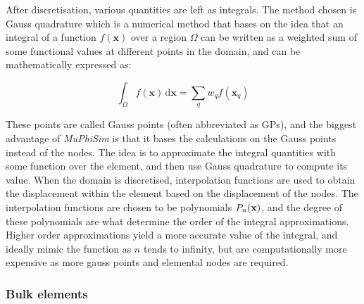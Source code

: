 \documentclass[oneside,11pt,times]{book}
\begin{document}
After discretisation, various quantities are left as integrals. The method chosen is Gauss quadrature which is a numerical method that bases on the idea that an integral of a function $f(\bm{x})$ over a region $\Omega$ can be written as a weighted sum of some functional values at different points in the domain, and can be mathematically expressed as:

\begin{equation} \label{eq:approxElem}
	\int_{\Omega} f(\bm{x}) \, \text{d} \bm{x} = \sum_{q} w_q f(\bm{x}_q)
\end{equation}

These points are called Gauss points (often abbreviated as GPs), and the biggest advantage of \textit{MuPhiSim} is that it bases the calculations on the Gauss points instead of the nodes. The idea is to approximate the integral quantities with some function over the element, and then use Gauss quadrature to compute its value. When the domain is discretised, interpolation functions are used to obtain the displacement within the element based on the displacement of the nodes. The interpolation functions are chosen to be polynomials $P_n(\bf{x})$, and the degree of these polynomials are what determine the order of the integral approximations. Higher order approximations yield a more accurate value of the integral, and ideally mimic the function as $n$ tends to infinity, but are computationally more expensive as more gauss points and elemental nodes are required.
\subsubsection{Bulk elements}
\end{document}
